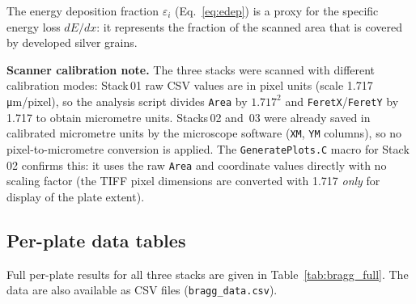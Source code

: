 \documentclass[12pt,a4paper]{article}
\begin{document}
The energy deposition fraction $\varepsilon_i$ (Eq.~\ref{eq:edep}) is a
proxy for the specific energy loss $dE/dx$: it represents the
fraction of the scanned area that is covered by developed silver
grains.

\noindent\textbf{Scanner calibration note.}
The three stacks were scanned with different calibration modes:
Stack\,01 raw CSV values are in pixel units (scale
1.717\,\si{\micro\meter}/pixel), so the analysis script divides
\texttt{Area} by $1.717^2$ and \texttt{FeretX}/\texttt{FeretY} by
1.717 to obtain micrometre units.
Stacks\,02 and~03 were already saved in calibrated micrometre units by
the microscope software (\texttt{XM}, \texttt{YM} columns), so no
pixel-to-micrometre conversion is applied.
The \texttt{GeneratePlots.C} macro for Stack\,02 confirms this: it
uses the raw \texttt{Area} and coordinate values directly with no
scaling factor (the TIFF pixel dimensions are converted with 1.717
\emph{only} for display of the plate extent).

\subsection{Per-plate data tables}

Full per-plate results for all three stacks are given in
Table~\ref{tab:bragg_full}. The data are also available as CSV files
(\texttt{bragg\_data.csv}).
\end{document}
